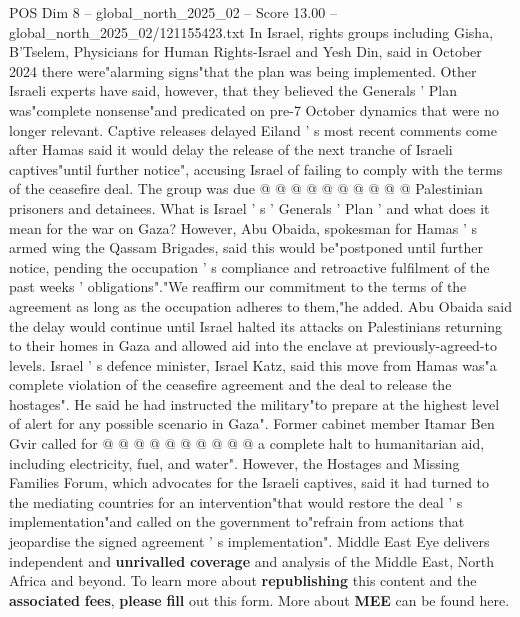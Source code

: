\begin{textsample}{POS Dim 8 – global\_north\_2025\_02 – Score 13.00 – global\_north\_2025\_02/121155423.txt}
In Israel, rights groups including Gisha, B'Tselem, Physicians for Human Rights-Israel and Yesh Din, said in October 2024 there were"alarming signs"that the plan was being implemented.
Other Israeli experts have said, however, that they believed the Generals ' Plan was"complete nonsense"and predicated on pre-7 October dynamics that were no longer relevant.
Captive releases delayed Eiland ' s most recent comments come after Hamas said it would delay the release of the next tranche of Israeli captives"until further notice", accusing Israel of failing to comply with the terms of the ceasefire deal.
The group was due @ @ @ @ @ @ @ @ @ @ Palestinian prisoners and detainees.
What is Israel ' s ' Generals ' Plan ' and what does it mean for the war on Gaza?
However, Abu Obaida, spokesman for Hamas ' s armed wing the Qassam Brigades, said this would be"postponed until further notice, pending the occupation ' s compliance and retroactive fulfilment of the past weeks ' obligations"."We reaffirm our commitment to the terms of the agreement as long as the occupation adheres to them,"he added.
Abu Obaida said the delay would continue until Israel halted its attacks on Palestinians returning to their homes in Gaza and allowed aid into the enclave at previously-agreed-to levels.
Israel ' s defence minister, Israel Katz, said this move from Hamas was"a complete violation of the ceasefire agreement and the deal to release the hostages".
He said he had instructed the military"to prepare at the highest level of alert for any possible scenario in Gaza".
Former cabinet member Itamar Ben Gvir called for @ @ @ @ @ @ @ @ @ @ a complete halt to humanitarian aid, including electricity, fuel, and water".
However, the Hostages and Missing Families Forum, which advocates for the Israeli captives, said it had turned to the mediating countries for an intervention"that would restore the deal ' s implementation"and called on the government to"refrain from actions that jeopardise the signed agreement ' s implementation".
Middle East Eye delivers independent and \textbf{unrivalled} \textbf{coverage} and analysis of the Middle East, North Africa and beyond.
To learn more about \textbf{republishing} this content and the \textbf{associated} \textbf{fees}, \textbf{please} \textbf{fill} out this form.
More about \textbf{MEE} can be found here.

\end{textsample}
